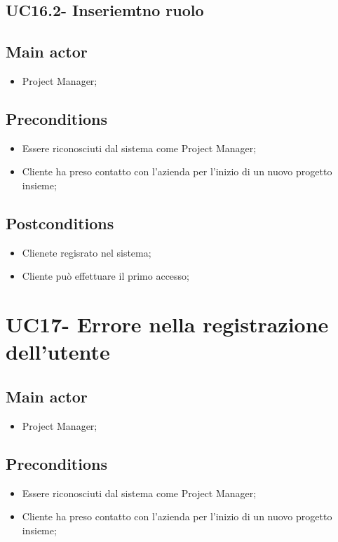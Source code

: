 \documentclass{article}
\begin{document}
    \subsection{UC16.2- Inseriemtno ruolo}
    \subsection*{Main actor}
        \begin{itemize}
            \item Project Manager;
        \end{itemize}
        
    \subsection*{Preconditions}
        \begin{itemize}
            \item Essere riconosciuti dal sistema come Project Manager;
            \item Cliente ha preso contatto con l'azienda per l'inizio di un nuovo progetto insieme;
        \end{itemize}
        
    \subsection*{Postconditions}
        \begin{itemize}
            \item Clienete regisrato nel sistema;
            \item Cliente può effettuare il primo accesso;
        \end{itemize}

\section{UC17- Errore nella registrazione dell'utente}
\subsection*{Main actor}
        \begin{itemize}
            \item Project Manager;
        \end{itemize}
        
    \subsection*{Preconditions}
        \begin{itemize}
            \item Essere riconosciuti dal sistema come Project Manager;
            \item Cliente ha preso contatto con l'azienda per l'inizio di un nuovo progetto insieme;
        \end{itemize}
        
\end{document}
